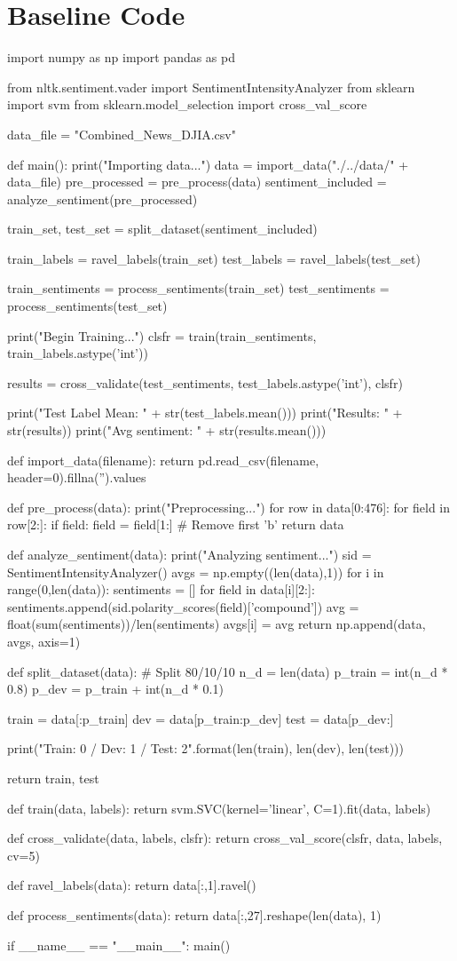 \documentclass{article} %
\begin{document}
\section{Baseline Code}
\begin{python}
import numpy as np
import pandas as pd

from nltk.sentiment.vader import SentimentIntensityAnalyzer
from sklearn import svm
from sklearn.model_selection import cross_val_score

data_file = "Combined_News_DJIA.csv"

def main():
  print("Importing data...")
  data = import_data("./../data/" + data_file)
  pre_processed = pre_process(data)
  sentiment_included = analyze_sentiment(pre_processed)

  train_set, test_set = split_dataset(sentiment_included)

  train_labels = ravel_labels(train_set)
  test_labels = ravel_labels(test_set)

  train_sentiments = process_sentiments(train_set)
  test_sentiments = process_sentiments(test_set)

  print("Begin Training...")
  clsfr = train(train_sentiments, train_labels.astype('int'))

  results = cross_validate(test_sentiments, test_labels.astype('int'), clsfr)

  print("Test Label Mean: " + str(test_labels.mean()))
  print("Results: " + str(results))
  print("Avg sentiment: " + str(results.mean()))

def import_data(filename):
  return pd.read_csv(filename, header=0).fillna('').values

def pre_process(data):
  print("Preprocessing...")
  for row in data[0:476]:
    for field in row[2:]:
      if field:
        field = field[1:] # Remove first 'b'
  return data

def analyze_sentiment(data):
  print("Analyzing sentiment...")
  sid = SentimentIntensityAnalyzer()
  avgs = np.empty((len(data),1))
  for i in range(0,len(data)):
    sentiments = []
    for field in data[i][2:]:
      sentiments.append(sid.polarity_scores(field)['compound'])
    avg = float(sum(sentiments))/len(sentiments)
    avgs[i] = avg
  return np.append(data, avgs, axis=1)

def split_dataset(data):
  # Split 80/10/10
  n_d = len(data)
  p_train = int(n_d * 0.8)
  p_dev = p_train + int(n_d * 0.1)

  train = data[:p_train]
  dev = data[p_train:p_dev]
  test = data[p_dev:]

  print("Train: {0} / Dev: {1} / Test: {2}".format(len(train), len(dev), len(test)))

  return train, test

def train(data, labels):
  return svm.SVC(kernel='linear', C=1).fit(data, labels)

def cross_validate(data, labels, clsfr):
  return cross_val_score(clsfr, data, labels, cv=5)

def ravel_labels(data):
  return data[:,1].ravel()

def process_sentiments(data):
  return data[:,27].reshape(len(data), 1)

if __name__ == "__main__":
  main()
\end{python}
\end{document}
